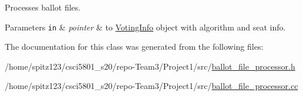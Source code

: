 Processes ballot files. 


\begin{DoxyParams}[1]{Parameters}
\mbox{\tt in}  & {\em pointer} & to \hyperlink{classVotingInfo}{Voting\+Info} object with algorithm and seat info. \\
\hline
\end{DoxyParams}


The documentation for this class was generated from the following files\+:\begin{DoxyCompactItemize}
\item 
/home/spitz123/csci5801\+\_\+s20/repo-\/\+Team3/\+Project1/src/\hyperlink{ballot__file__processor_8h}{ballot\+\_\+file\+\_\+processor.\+h}\item 
/home/spitz123/csci5801\+\_\+s20/repo-\/\+Team3/\+Project1/src/\hyperlink{ballot__file__processor_8cc}{ballot\+\_\+file\+\_\+processor.\+cc}\end{DoxyCompactItemize}
